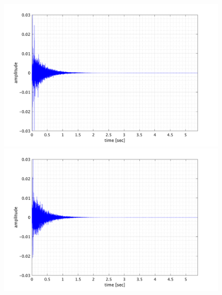 \documentclass[11pt,a4j]{jreport}
\begin{document}
\begin{figure}[H]
  \begin{minipage}[b]{.5\linewidth}
    \centering
    \includegraphics[width=.8\linewidth]{images/convolutedIr/REV1.png}
  \end{minipage}%
  \begin{minipage}[b]{.5\linewidth}
    \centering
    \includegraphics[width=.8\linewidth]{images/convolutedIr/REV2.png}
  \end{minipage}


\end{figure}
\end{document}
